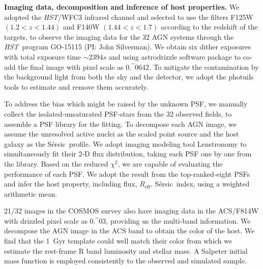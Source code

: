 \documentclass{natureprintstyle}
\newcommand{\hst}{{\it HST}}
\newcommand{\lhost}{$L_{\rm host}$}
\newcommand{\sersic}{S\'ersic}
\newcommand{\lenstronomy}{{\sc Lenstronomy}}
\newcommand{\reff}{{$R_{\mathrm{eff}}$}}
\newcommand{\mstar}{{$M_*$}}
\newcommand{\farcs}{\mbox{\ensuremath{.\!\!^{\prime\prime}}}}%
\begin{document}
\textbf{Imaging data, decomposition and inference of host properties.} 
We adopted the \hst/WFC3 infrared channel and selected to use the filters F125W $(1.2<z<1.44)$ and F140W $(1.44<z<1.7)$ according to the redshift of the targets, to observe the imaging data for the 32 AGN systems through the \hst\ program GO-15115 (PI: John Silverman). We obtain six dither exposures with total exposure time $\sim2394s$ and using  {\sc astrodrizzle} software package to co-add the final image with pixel scale as 0\farcs0642. To mitigate the contamination by the background light from both the sky and the detector, we adopt the {\sc photuils} tools to estimate and remove them accurately.

To address the bias which might be raised by the unknown PSF, we manually collect the isolated-unsaturated PSF-stars from the 32 observed fields, to assemble a PSF library for the fitting. To decompose each AGN image, we assume the unresolved active nuclei as the scaled point source and the host galaxy as the \sersic\ profile. We adopt imaging modeling tool \lenstronomy\cite{lenstronomy} to simultaneously fit their 2-D flux distribution, taking each PSF one by one from the library. Based on the reduced $\chi^2$, we are capable of evaluating the performance of each PSF. We adopt the result from the top-ranked-eight PSFs and infer the host property, including flux, \reff, \sersic\ index, using a weighted arithmetic mean.

21/32 images in the COSMOS survey also have imaging data in the ACS/F814W with drizzled pixel scale as 0\farcs03, providing us the multi-band information. We decompose the AGN image in the ACS band to obtain the color of the host. We find that the 1~Gyr template could well match their color from which we estimate the rest-frame R band luminosity and stellar mass. A Salpeter initial mass function is employed consistently to the observed and simulated sample.

\end{document}
